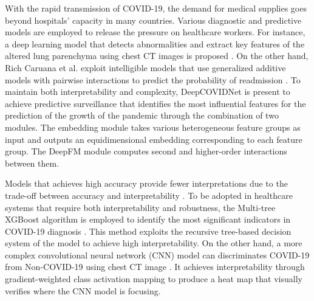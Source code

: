 
With the rapid transmission of COVID-19, the demand for medical supplies goes beyond hospitals' capacity in many countries. Various diagnostic and predictive models are employed to release the pressure on healthcare workers. For instance, a deep learning model that detects abnormalities and extract key features of the altered lung parenchyma using chest CT images is proposed \citep{Basu2020Deep}. On the other hand, Rich Caruana et al. exploit intelligible models that use generalized additive models with pairwise interactions to predict the probability of readmission \citep{Caruana2015IntelligibleMF}. To maintain both interpretability and complexity, DeepCOVIDNet is present to achieve predictive surveillance that identifies the most influential features for the prediction of the growth of the pandemic\citep{ramch2020deepcovidnet} through the combination of two modules. The embedding module takes various heterogeneous feature groups as input and outputs an equidimensional embedding corresponding to each feature group. The DeepFM \citep{guo2017deepfm} module computes second and higher-order interactions between them.



Models that achieves high accuracy provide fewer interpretations due to the trade-off between accuracy and interpretability \citep{doshivelez2017rigorous}. To be adopted in healthcare systems that require both interpretability and robustness\citep{goodfellow2014explaining}, the Multi-tree XGBoost algorithm is employed to identify the most significant indicators in COVID-19 diagnosis \citep{Yan2020}. This method exploits the recursive tree-based decision system of the model to achieve high interpretability. On the other hand, a more complex convolutional neural network (CNN) model can discriminates COVID-19 from Non-COVID-19 using chest CT image \citep{matsuyama2020deep}. It achieves interpretability through gradient-weighted class activation mapping to produce a heat map that visually verifies where the CNN model is focusing.

